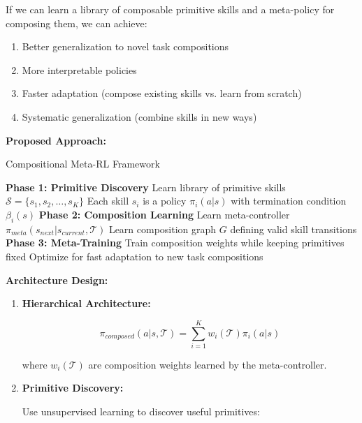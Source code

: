 \documentclass[12pt]{article}
\newcommand{\ieee}[1]{\textcolor{IEEEBlue}{\textbf{#1}}}
\begin{document}
{{			If we can learn a library of composable primitive skills and a meta-policy for composing them, we can achieve:
			
			\begin{enumerate}
				\item Better generalization to novel task compositions
				\item More interpretable policies
				\item Faster adaptation (compose existing skills vs. learn from scratch)
				\item Systematic generalization (combine skills in new ways)
			\end{enumerate}
			
			\ieee{Proposed Approach:}
			
			\begin{algorithm}[H]
			\caption{Compositional Meta-RL Framework}
			\begin{algorithmic}[1]
			\STATE \textbf{Phase 1: Primitive Discovery}
			\STATE Learn library of primitive skills $\mathcal{S} = \{s_1, s_2, \ldots, s_K\}$
			\STATE Each skill $s_i$ is a policy $\pi_i(a|s)$ with termination condition $\beta_i(s)$
			\STATE \textbf{Phase 2: Composition Learning}
			\STATE Learn meta-controller $\pi_{meta}(s_{next}|s_{current}, \mathcal{T})$
			\STATE Learn composition graph $G$ defining valid skill transitions
			\STATE \textbf{Phase 3: Meta-Training}
			\STATE Train composition weights while keeping primitives fixed
			\STATE Optimize for fast adaptation to new task compositions
			\end{algorithmic}
			\end{algorithm}
			
			\ieee{Architecture Design:}
			
			\begin{enumerate}
				\item \textbf{Hierarchical Architecture:}
				
				\begin{equation}
				\pi_{composed}(a|s, \mathcal{T}) = \sum_{i=1}^K w_i(\mathcal{T}) \pi_i(a|s)
				\end{equation}
				
				where $w_i(\mathcal{T})$ are composition weights learned by the meta-controller.
				
				\item \textbf{Primitive Discovery:}
				
				Use unsupervised learning to discover useful primitives:
				

\end{enumerate}}}
\end{document}
